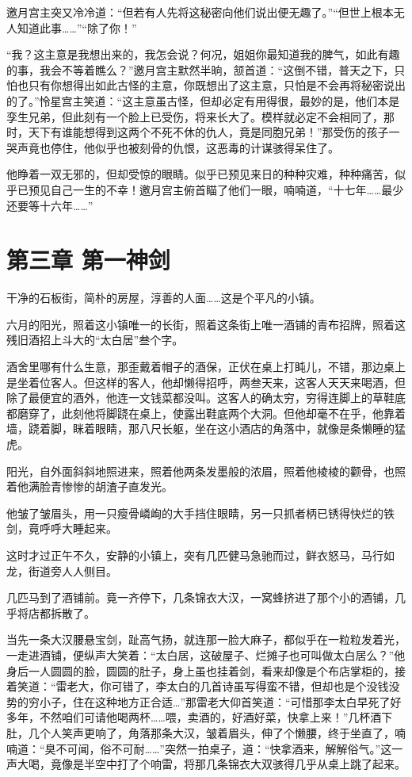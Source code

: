 \documentclass[12pt,oneside]{book}
\begin{document}
邀月宫主突又冷冷道：``但若有人先将这秘密向他们说出便无趣了。''``但世上根本无人知道此事\ldots\ldots{}''``除了你！''

``我？这主意是我想出来的，我怎会说？何况，姐姐你最知道我的脾气，如此有趣的事，我会不等着瞧么？''邀月宫主默然半晌，颔首道：``这倒不错，普天之下，只怕也只有你想得出如此古怪的主意，你既想出了这主意，只怕是不会再将秘密说出的了。''怜星宫主笑道：``这主意虽古怪，但却必定有用得很，最妙的是，他们本是孪生兄弟，但此刻有一个脸上已受伤，将来长大了。模样就必定不会相同了，那时，天下有谁能想得到这两个不死不休的仇人，竟是同胞兄弟！''那受伤的孩子一哭声竟也停住，他似乎也被刻骨的仇恨，这恶毒的计谋骇得呆住了。

他睁着一双无邪的，但却受惊的眼睛。似乎已预见来日的种种灾难，种种痛苦，似乎已预见自己一生的不幸！邀月宫主俯首瞄了他们一眼，喃喃道，``十七年\ldots\ldots 最少还要等十六年\ldots\ldots{}''

\hypertarget{ux7b2cux4e09ux7ae0-ux7b2cux4e00ux795eux5251}{%
\chapter{第三章
第一神剑}\label{ux7b2cux4e09ux7ae0-ux7b2cux4e00ux795eux5251}}

干净的石板街，简朴的房屋，淳善的人面\ldots\ldots 这是个平凡的小镇。

六月的阳光，照着这小镇唯一的长街，照着这条街上唯一酒铺的青布招牌，照着这残旧酒招上斗大的``太白居''叁个字。

酒舍里哪有什么生意，那歪戴着帽子的酒保，正伏在桌上打盹儿，不错，那边桌上是坐着位客人。但这样的客人，他却懒得招呼，两叁天来，这客人天天来喝酒，但除了最便宜的酒外，他连一文钱菜都没叫。这客人的确太穷，穷得连脚上的草鞋底都磨穿了，此刻他将脚跷在桌上，使露出鞋底两个大洞。但他却毫不在乎，他靠着墙，跷着脚，眯着眼睛，那八尺长躯，坐在这小酒店的角落中，就像是条懒睡的猛虎。

阳光，自外面斜斜地照进来，照着他两条发墨般的浓眉，照着他棱棱的颧骨，也照着他满脸青惨惨的胡渣子直发光。

他皱了皱眉头，用一只瘦骨嶙峋的大手挡住眼睛，另一只抓者柄已锈得快烂的铁剑，竟呼呼大睡起来。

这时才过正午不久，安静的小镇上，突有几匹健马急驰而过，鲜衣怒马，马行如龙，街道旁人人侧目。

几匹马到了酒铺前。竟一齐停下，几条锦衣大汉，一窝蜂挤进了那个小的酒铺，几乎将店都拆散了。

当先一条大汉腰悬宝剑，趾高气扬，就连那一脸大麻子，都似乎在一粒粒发着光，一走进酒铺，便纵声大笑着：``太白居，这破屋子、烂摊子也可叫做太白居么？''他身后一人圆圆的脸，圆圆的肚子，身上虽也挂着剑，看来却像是个布店掌柜的，接着笑道：``雷老大，你可错了，李太白的几首诗虽写得蛮不错，但却也是个没钱没势的穷小子，住在这种地方正合适\ldots{}''那雷老大仰首笑道：``可惜那李太白早死了好多年，不然咱们可请他喝两杯\ldots\ldots 喂，卖酒的，好酒好菜，快拿上来！''几杯酒下肚，几个人笑声更响了，角落那条大汉，皱着眉头，伸了个懒腰，终于坐直了，喃喃道：``臭不可闻，俗不可耐\ldots\ldots{}''突然一拍桌子，道：``快拿酒来，解解俗气。''这一声大喝，竟像是半空中打了个响雷，将那几条锦衣大双骇得几乎从桌上跳了起来。
\end{document}
